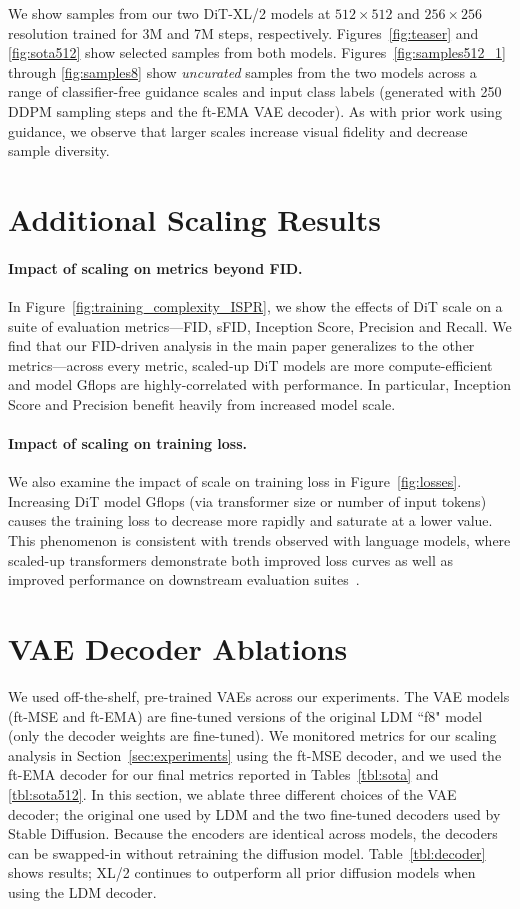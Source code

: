 \documentclass[10pt,twocolumn,letterpaper]{article}
\begin{document}
We show samples from our two DiT-XL/2 models at $512\times512$ and $256\times256$ resolution trained for 3M and 7M steps, respectively. Figures~\ref{fig:teaser} and \ref{fig:sota512} show selected samples from both models. Figures~\ref{fig:samples512_1} through \ref{fig:samples8} show \textit{uncurated} samples from the two models across a range of classifier-free guidance scales and input class labels (generated with 250 DDPM sampling steps and the ft-EMA VAE decoder). As with prior work using guidance, we observe that larger scales increase visual fidelity and decrease sample diversity.

\section{Additional Scaling Results}

\paragraph{Impact of scaling on metrics beyond FID.} In Figure~\ref{fig:training_complexity_ISPR}, we show the effects of DiT scale on a suite of evaluation metrics---FID, sFID, Inception Score, Precision and Recall. We find that our FID-driven analysis in the main paper generalizes to the other metrics---across every metric, scaled-up DiT models are more compute-efficient and model Gflops are highly-correlated with performance. In particular, Inception Score and Precision benefit heavily from increased model scale.

\paragraph{Impact of scaling on training loss.} We also examine the impact of scale on training loss in Figure~\ref{fig:losses}. Increasing DiT model Gflops (via transformer size or number of input tokens) causes the training loss to decrease more rapidly and saturate at a lower value. This phenomenon is consistent with trends observed with language models, where scaled-up transformers demonstrate both improved loss curves as well as improved performance on downstream evaluation suites~\cite{kaplan2020scaling}.

\section{VAE Decoder Ablations}
We used off-the-shelf, pre-trained VAEs across our experiments. The VAE models (ft-MSE and ft-EMA) are fine-tuned versions of the original LDM ``f8" model (only the decoder weights are fine-tuned). We monitored metrics for our scaling analysis in Section~\ref{sec:experiments} using the ft-MSE decoder, and we used the ft-EMA decoder for our final metrics reported in Tables~\ref{tbl:sota} and \ref{tbl:sota512}. In this section, we ablate three different choices of the VAE decoder; the original one used by LDM and the two fine-tuned decoders used by Stable Diffusion. Because the encoders are identical across models, the decoders can be swapped-in without retraining the diffusion model. Table~\ref{tbl:decoder} shows results; XL/2 continues to outperform all prior diffusion models when using the LDM decoder.
\end{document}

